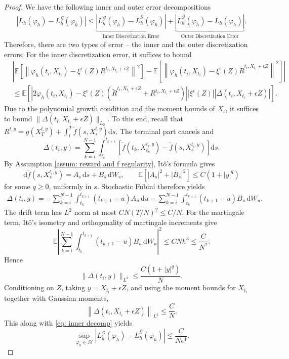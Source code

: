 \documentclass[twoside,11pt]{article}
\newcommand{\dd}{\mathrm{d}}
\newcommand{\E}{\mathbb{E}}
\newcommand{\1}{\mathbf{1}}
\numberwithin{equation}{section}
\begin{document}
\begin{proof}
We have the following inner and outer error decompositions
\begin{equation}
    \begin{aligned}
        \left|L_h(\varphi_h) - L_h^{\mathcal{G}}(\varphi_h)\right|\le \underbrace{\left|L_h^{\mathscr G}(\varphi_h)-\bar L_h^{\mathscr G}(\varphi_h) \right|}_{\textrm{Inner Discretization Error}}+ \underbrace{\left| \bar L_h^{\mathscr G}(\varphi_h)-L_h(\varphi_h)\right|}_{\textrm{Outer Discretization Error}}.
    \end{aligned}
\end{equation}
Therefore, there are two types of error -- the inner and the outer discretization errors.
For the inner discretization error, it suffices to bound
\begin{equation}\label{eq: inner decomp}
\begin{aligned}
     &\left| \E \left[ \left\| \varphi_h(t_i, X_{t_i}) - \xi^\epsilon(Z)R^{t_i, X_{t_i}+\epsilon Z} \right\|^2 \right] - \E \left[ \left\| \varphi_h(t_i, X_{t_i}) - \xi^\epsilon(Z)\tilde R^{t_i, X_{t_i}+\epsilon Z} \right\|^2 \right]\right|\\
     &\le \E\left[ \left| 2\varphi_h(t_i,X_{t_i}) - \xi^{\epsilon}(Z)(\tilde R^{t_i,X_{t_i}+ \epsilon Z} + R^{t_i,X_{t_i} + \epsilon Z})\right|\left| \xi^{\epsilon}(Z)\right|\left|\Delta(t_i,X_{t_i}+\epsilon Z)\right|\right].
\end{aligned}
\end{equation}
Due to the polynomial growth condition and the moment bounds of $ X_t$, it suffices to bound $ \|\Delta(t_i,X_{t_i} + \epsilon Z)\|_{L_2}$.
To this end,
recall that $R^{t,y} = g(X_T^{t,y}) + \int_t^T \tilde f(s, X_s^{t,y}) \dd s$. The terminal part cancels and
\[
    \Delta(t_i,y)
    =
    \sum_{k=i}^{N-1}
    \int_{t_k}^{t_{k+1}}
    \left[
    \tilde f(t_k,X_{t_k}^{t_i,y})
    -
    \tilde f(s,X_s^{t_i,y})
    \right]\dd s .
\]
By Assumption \ref{assum: reward and f regularity}, It\^o's formula gives
\[
    \dd \tilde f(s,X_s^{t_i,y})
    =
    A_s\,\dd s+ B_{s}\,\dd W_s,
    \qquad
    \E\left[|A_s|^2+|B_{s}|^2\right]
    \le C(1+|y|^q)
\]
for some $q\ge0$, uniformly in $s$.
Stochastic Fubini therefore yields
\[
\begin{aligned}
    \Delta(t_i,y)
    =
    -\sum_{k=i}^{N-1}
    \int_{t_k}^{t_{k+1}}(t_{k+1}-u)A_u\,\dd u
    -\sum_{k=i}^{N-1}
    \int_{t_k}^{t_{k+1}}(t_{k+1}-u)B_{u}\,\dd W_u .
\end{aligned}
\]
The drift term has $L^2$ norm at most $CN(T/N)^2\le C/N$.
For the martingale term, It\^o's isometry and orthogonality of martingale
increments give
\[
    \E\left|
    \sum_{k=i}^{N-1}
    \int_{t_k}^{t_{k+1}}(t_{k+1}-u)B_{u}\,\dd W_u
    \right|^2
    \le
    CNh^3
    \le
    \frac{C}{N^2}.
\]
Hence
\[
    \|\Delta(t_i,y)\|_{L^2}
    \le
    \frac{C(1+|y|^q)}{N}.
\]
Conditioning on $Z$, taking $y=X_{t_i}+\epsilon Z$, and using the moment
bounds for $X_{t_i}$ together with Gaussian moments,
\[
    \left\|
    \Delta(t_i,X_{t_i}+\epsilon Z)
    \right\|_{L^2}
    \le
    \frac{C}{N}.
\]
This along with \eqref{eq: inner decomp} yields
\[
    \sup_{\varphi_h\in\mathcal H}
    |L_h^{\mathscr G}(\varphi_h)-\bar L_h^{\mathscr G}(\varphi_h)|
    \le
    \frac{C}{N\epsilon^4}.
\]



\end{proof}
\end{document}
